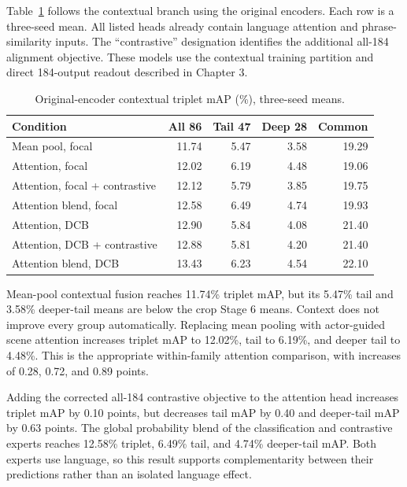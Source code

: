Table~\ref{tab:context-original} follows the contextual branch using the original encoders. Each row is a three-seed mean. All listed heads already contain language attention and phrase-similarity inputs. The ``contrastive'' designation identifies the additional all-184 alignment objective. These models use the contextual training partition and direct 184-output readout described in Chapter 3.

\begin{table}[htbp]
\centering
\caption{Original-encoder contextual triplet mAP (\%), three-seed means.}
\label{tab:context-original}
\begin{singlespace}
\begin{tabularx}{\textwidth}{@{}Xrrrr@{}}
\toprule
\textbf{Condition} & \textbf{All 86} & \textbf{Tail 47} & \textbf{Deep 28} & \textbf{Common} \\
\midrule
Mean pool, focal & 11.74 & 5.47 & 3.58 & 19.29 \\
Attention, focal & 12.02 & 6.19 & 4.48 & 19.06 \\
Attention, focal + contrastive & 12.12 & 5.79 & 3.85 & 19.75 \\
Attention blend, focal & 12.58 & 6.49 & 4.74 & 19.93 \\
Attention, DCB & 12.90 & 5.84 & 4.08 & 21.40 \\
Attention, DCB + contrastive & 12.88 & 5.81 & 4.20 & 21.40 \\
Attention blend, DCB & 13.43 & 6.23 & 4.54 & 22.10 \\
\bottomrule
\end{tabularx}
\end{singlespace}
\end{table}

Mean-pool contextual fusion reaches 11.74\% triplet mAP, but its 5.47\% tail and 3.58\% deeper-tail means are below the crop Stage 6 means. Context does not improve every group automatically. Replacing mean pooling with actor-guided scene attention increases triplet mAP to 12.02\%, tail to 6.19\%, and deeper tail to 4.48\%. This is the appropriate within-family attention comparison, with increases of 0.28, 0.72, and 0.89 points.

Adding the corrected all-184 contrastive objective to the attention head increases triplet mAP by 0.10 points, but decreases tail mAP by 0.40 and deeper-tail mAP by 0.63 points. The global probability blend of the classification and contrastive experts reaches 12.58\% triplet, 6.49\% tail, and 4.74\% deeper-tail mAP. Both experts use language, so this result supports complementarity between their predictions rather than an isolated language effect.

